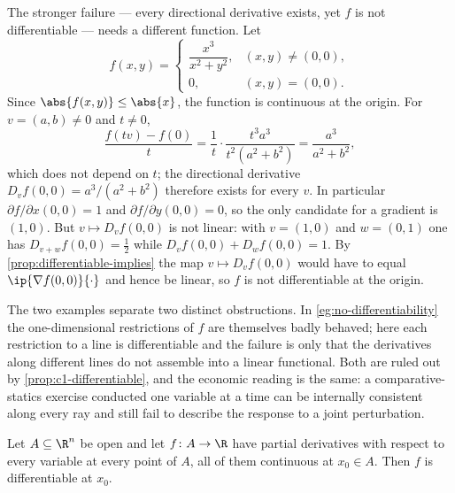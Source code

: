 \begin{eg}
	\label{eg:directional-not-linear}
	The stronger failure --- every directional derivative exists, yet $f$ is not
	differentiable --- needs a different function. Let
	\[
		f(x,y)=
		\begin{cases}
			\dfrac{x^3}{x^2+y^2}, & (x,y)\neq(0,0), \\[1.5ex]
			0,                    & (x,y)=(0,0).
		\end{cases}
	\]
	Since $\abs{f(x,y)}\leq\abs{x}$, the function is continuous at the origin. For
	$v=(a,b)\neq0$ and $t\neq0$,
	\[
		\frac{f(tv)-f(0)}{t}
		=\frac1t\cdot\frac{t^3a^3}{t^2(a^2+b^2)}=\frac{a^3}{a^2+b^2},
	\]
	which does not depend on $t$; the directional derivative
	$D_vf(0,0)=a^3/(a^2+b^2)$ therefore exists for every $v$. In particular
	$\partial f/\partial x(0,0)=1$ and $\partial f/\partial y(0,0)=0$, so the only
	candidate for a gradient is $(1,0)$. But $v\mapsto D_vf(0,0)$ is not linear:
	with $v=(1,0)$ and $w=(0,1)$ one has $D_{v+w}f(0,0)=\tfrac12$ while
	$D_vf(0,0)+D_wf(0,0)=1$. By \autoref{prop:differentiable-implies} the map
	$v\mapsto D_vf(0,0)$ would have to equal $\ip{\nabla f(0,0)}{\cdot}$ and hence
	be linear, so $f$ is not differentiable at the origin.

	The two examples separate two distinct obstructions. In
	\autoref{eg:no-differentiability} the one-dimensional restrictions of $f$ are
	themselves badly behaved; here each restriction to a line is differentiable and
	the failure is only that the derivatives along different lines do not assemble
	into a linear functional. Both are ruled out by
	\autoref{prop:c1-differentiable}, and the economic reading is the same: a
	comparative-statics exercise conducted one variable at a time can be internally
	consistent along every ray and still fail to describe the response to a joint
	perturbation.
\end{eg}

\begin{proposition}\label{prop:c1-differentiable}
	Let $A\subseteq\R^n$ be open and let $f\colon A\to\R$ have partial derivatives
	with respect to every variable at every point of $A$, all of them continuous at
	$x_0\in A$. Then $f$ is differentiable at $x_0$.
\end{proposition}

